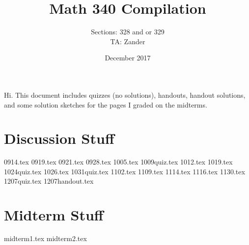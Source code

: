 \documentclass{article}
\title{Math 340 Compilation}
\author{Sections: 328 and or 329\\
TA: Zander}
\date{December 2017}
\begin{document}
 
    \maketitle
    
Hi. This document includes quizzes (no solutions), handouts, handout solutions, and some solution sketches for the pages I graded on the midterms. 
    
    \tableofcontents

 
    \section{Discussion Stuff}
        {0914.tex}
           {0919.tex}
    {0921.tex}
    {0928.tex}
    {1005.tex}
    {1009quiz.tex}
    {1012.tex}
        {1019.tex}
            {1024quiz.tex}
    {1026.tex}
    {1031quiz.tex}
    {1102.tex}
    {1109.tex}
    {1114.tex}
        {1116.tex}
    {1130.tex}
    {1207quiz.tex}
    {1207handout.tex}


 
    \section{Midterm Stuff}
    {midterm1.tex}    
    {midterm2.tex}

 
\end{document}

